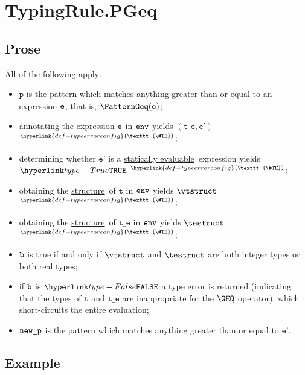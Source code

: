 \documentclass{book}
\newcommand\TypeErrorConfig[0]{\hyperlink{def-typeerrorconfig}{\texttt{\#TE}}}
\newcommand\ProseOrTypeError[0]{\hyperlink{def-proseortypeerror}{$^{\TypeErrorConfig}$}}
\newcommand\structure[0]{\hyperlink{def-structure}{structure}}
\newcommand\staticallyevaluable[0]{\hyperlink{def-staticallyevaluable}{statically evaluable}}
\newcommand\vp[0]{\texttt{p}}
\newcommand\vt[0]{\texttt{t}}
\newcommand\vte[0]{\texttt{t\_e}}
\newcommand\vep[0]{\texttt{e'}}
\begin{document}

\section{TypingRule.PGeq \label{sec:TypingRule.PGeq}}

\subsection{Prose}
All of the following apply:
\begin{itemize}
\item $\vp$ is the pattern which matches anything greater than or equal to an expression $\texttt{e}$,
that is, $\PatternGeq(\ve)$;
\item annotating the expression $\texttt{e}$ in $\texttt{env}$ yields $(\vte, \vep)$ \ProseOrTypeError;
\item determining whether $\vep$ is a \staticallyevaluable\ expression yields $\True$ \ProseOrTypeError;
\item obtaining the \structure\ of $\vt$ in $\texttt{env}$ yields $\vtstruct$ \ProseOrTypeError;
\item obtaining the \structure\ of $\vte$ in $\texttt{env}$ yields $\testruct$ \ProseOrTypeError;
\item $\texttt{b}$ is true if and only if $\vtstruct$ and $\testruct$ are both integer types or both real types;
\item if $\texttt{b}$ is $\False$ a type error is returned (indicating that the types of $\vt$ and $\vte$
      are inappropriate for the $\GEQ$ operator),
which short-circuits the entire evaluation;
\item $\texttt{new\_p}$ is the pattern which matches anything greater than or equal to $\vep$.
\end{itemize}

\subsection{Example}

\end{document}
